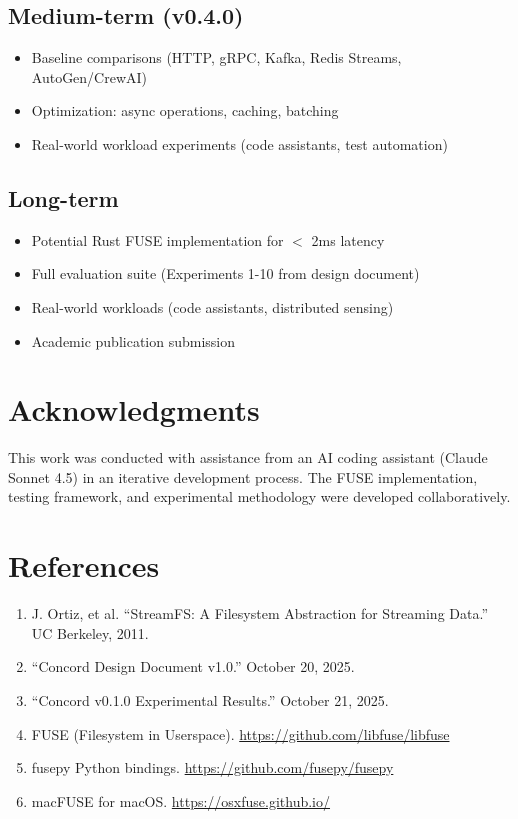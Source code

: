 \documentclass[11pt]{article}
\begin{document}
\subsection{Medium-term (v0.4.0)}

\begin{itemize}
\item Baseline comparisons (HTTP, gRPC, Kafka, Redis Streams, AutoGen/CrewAI)
\item Optimization: async operations, caching, batching
\item Real-world workload experiments (code assistants, test automation)
\end{itemize}

\subsection{Long-term}

\begin{itemize}
\item Potential Rust FUSE implementation for $<$ 2ms latency
\item Full evaluation suite (Experiments 1-10 from design document)
\item Real-world workloads (code assistants, distributed sensing)
\item Academic publication submission
\end{itemize}

\section{Acknowledgments}

This work was conducted with assistance from an AI coding assistant (Claude Sonnet 4.5) in an iterative development process. The FUSE implementation, testing framework, and experimental methodology were developed collaboratively.

\section{References}

\begin{enumerate}
\item J. Ortiz, et al. ``StreamFS: A Filesystem Abstraction for Streaming Data.'' UC Berkeley, 2011.
\item ``Concord Design Document v1.0.'' October 20, 2025.
\item ``Concord v0.1.0 Experimental Results.'' October 21, 2025.
\item FUSE (Filesystem in Userspace). \url{https://github.com/libfuse/libfuse}
\item fusepy Python bindings. \url{https://github.com/fusepy/fusepy}
\item macFUSE for macOS. \url{https://osxfuse.github.io/}
\end{enumerate}
\end{document}
